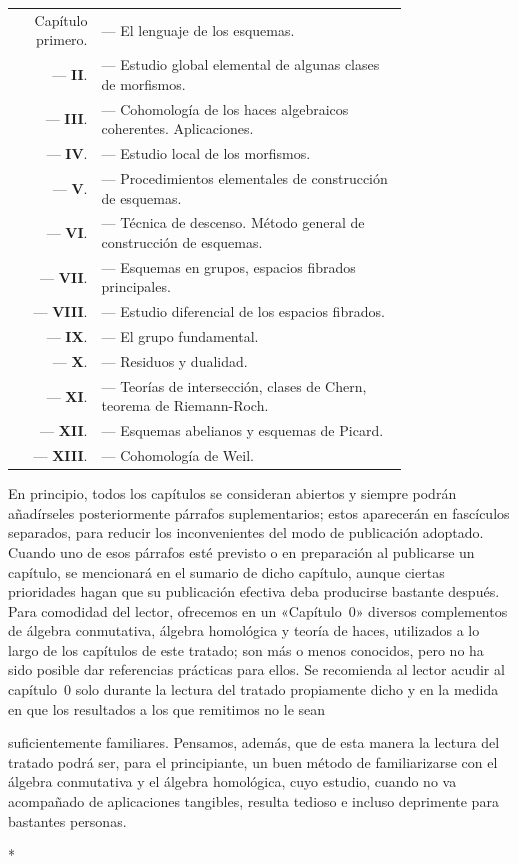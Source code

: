\medskip
\begin{tabular}{r p{0.78\linewidth}}
  Capítulo primero. & --- El lenguaje de los esquemas.\\
  --- \textbf{II}. & --- Estudio global elemental de algunas clases de morfismos.\\
  --- \textbf{III}. & --- Cohomología de los haces algebraicos coherentes. Aplicaciones.\\
  --- \textbf{IV}. & --- Estudio local de los morfismos.\\
  --- \textbf{V}. & --- Procedimientos elementales de construcción de esquemas.\\
  --- \textbf{VI}. & --- Técnica de descenso. Método general de construcción de esquemas.\\
  --- \textbf{VII}. & --- Esquemas en grupos, espacios fibrados principales.\\
  --- \textbf{VIII}. & --- Estudio diferencial de los espacios fibrados.\\
  --- \textbf{IX}. & --- El grupo fundamental.\\
  --- \textbf{X}. & --- Residuos y dualidad.\\
  --- \textbf{XI}. & --- Teorías de intersección, clases de Chern, teorema de Riemann-Roch.\\
  --- \textbf{XII}. & --- Esquemas abelianos y esquemas de Picard.\\
  --- \textbf{XIII}. & --- Cohomología de Weil.\\
\end{tabular}
\medskip

En principio, todos los capítulos se consideran abiertos y siempre podrán añadírseles posteriormente párrafos suplementarios; estos aparecerán en fascículos separados, para reducir los inconvenientes del modo de publicación adoptado.
Cuando uno de esos párrafos esté previsto o en preparación al publicarse un capítulo, se mencionará en el sumario de dicho capítulo, aunque ciertas prioridades hagan que su publicación efectiva deba producirse bastante después.
Para comodidad del lector, ofrecemos en un «Capítulo~0» diversos complementos de álgebra conmutativa, álgebra homológica y teoría de haces, utilizados a lo largo de los capítulos de este tratado; son más o menos conocidos, pero no ha sido posible dar referencias prácticas para ellos.
Se recomienda al lector acudir al capítulo~0 solo durante la lectura del tratado propiamente dicho y en la medida en que los resultados a los que remitimos no le sean

suficientemente familiares.
Pensamos, además, que de esta manera la lectura del tratado podrá ser, para el principiante, un buen método de familiarizarse con el álgebra conmutativa y el álgebra homológica, cuyo estudio, cuando no va acompañado de aplicaciones tangibles, resulta tedioso e incluso deprimente para bastantes personas.

\bigskip
\begin{center}*\quad*\quad*\end{center}
\bigskip
